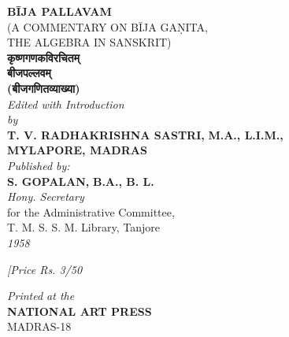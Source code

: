\documentclass[11pt, openany]{book}
\begin{document}
\begin{center}
   \textbf{\huge  BĪJA PALLAVAM} \\
    {\small (A COMMENTARY ON BĪJA GAṆITA,\\
 THE ALGEBRA IN SANSKRIT) \\}
\vspace{3cm}
\textbf{कृष्णगणकविरचितम्}\\
\vspace{3mm}
\textbf{\LARGE बीजपल्लवम्}\\
\vspace{3mm}
 \textbf{ (बीजगणितव्याख्या) }\\
\vspace{3cm}
{\englishfont
 \textit{Edited with Introduction}\\
 \vspace{2mm}
\textit{by}\\
\vspace{2mm}
 \textbf{\Large T. V. RADHAKRISHNA SASTRI,} \textbf{M.A., L.I.M.,}\\
\textbf{MYLAPORE, MADRAS}\\
\vspace{1.5cm}
 \textit{Published by:}\\
\vspace{2mm}
 \textbf{\Large S. GOPALAN,} \textbf{B.A., B. L.}\\
 \textit{Hony. Secretary}\\
 for the Administrative Committee,\\
 T. M. S. S. M. Library, Tanjore\\
\vspace{0.5cm}
\textit{\Large 1958}}
\end{center}
\vspace{-1.2cm}
{\begin{flushright}
\englishfont \textit{\Large [Price Rs. 3/50 }
\end{flushright}}
\newpage
\hfill\break
\vspace{6.5cm}
\begin{center}
 \englishfont   \textit{Printed at the \\}
  \textbf{NATIONAL ART PRESS\\}
 MADRAS-18\\
\end{center}
\thispagestyle{empty}
\newpage
\end{document}
